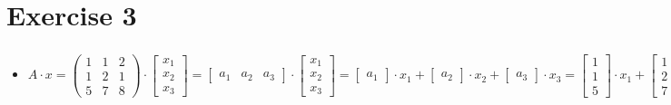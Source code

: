 \documentclass[%
   10pt,              %
   a4paper,           %
   DIV10,             %
]{scrartcl}%
\begin{document}
\section*{Exercise 3}
\begin{itemize}
	\item[a.)] $A \cdot x = \begin{pmatrix}
	1 & 1 & 2\\
	1 & 2 & 1\\
	5 & 7 & 8
	\end{pmatrix} \cdot \begin{bmatrix}
	x_1\\
	x_2\\
	x_3
	\end{bmatrix} = \begin{bmatrix}
	a_1 & a_2 & a_3
	\end{bmatrix} \cdot \begin{bmatrix}
	x_1\\
	x_2\\
	x_3
	\end{bmatrix} = \begin{bmatrix}
	a_1
	\end{bmatrix} \cdot x_1 + \begin{bmatrix}
	a_2
	\end{bmatrix} \cdot x_2 + \begin{bmatrix}
	a_3
	\end{bmatrix} \cdot x_3 = \begin{bmatrix}
	1\\
	1\\
	5
	\end{bmatrix} \cdot x_1 + \begin{bmatrix}
	1\\
	2\\
	7
	\end{bmatrix} \cdot x_2 + \begin{bmatrix}
	2\\
	1\\
	8
	\end{bmatrix} \cdot x_3 = \begin{bmatrix}
	x_1 + x_2 + x_3\\
	x_1 + 2x_2 + x_3\\
	5x_1 + 7x_2 + 8x_3
	\end{bmatrix}$
	

\end{itemize}
\end{document}
